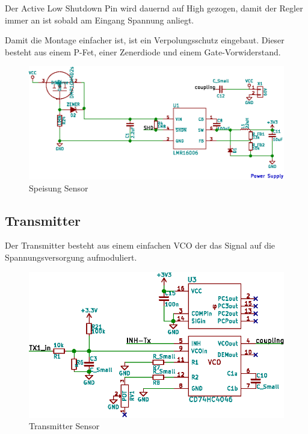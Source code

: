 Der Active Low Shutdown Pin wird dauernd auf High gezogen, damit der Regler immer an ist sobald am Eingang Spannung anliegt.

Damit die Montage einfacher ist, ist ein Verpolungsschutz eingebaut. Dieser besteht aus einem P-Fet, einer Zenerdiode und einem Gate-Vorwiderstand.

\begin{figure}[h!t]
    \centering
    \includegraphics[width=1\textwidth]{images/sensor-sch/sensor--sch--supply.eps}
    \caption[Sensor: Schema Speisung]{Speisung Sensor}
\end{figure}

\subsection{Transmitter}
\label{subsec:hw:sensor:transmitter}

Der Transmitter besteht aus einem einfachen VCO der das Signal auf die Spannungsversorgung aufmoduliert.


\begin{figure}[h!t]
    \centering
    \includegraphics[width=1\textwidth]{images/sensor-sch/sensor--sch--transmitter.eps}
    \caption[Sensor: Schema Transmitter]{Transmitter Sensor}
\end{figure}

